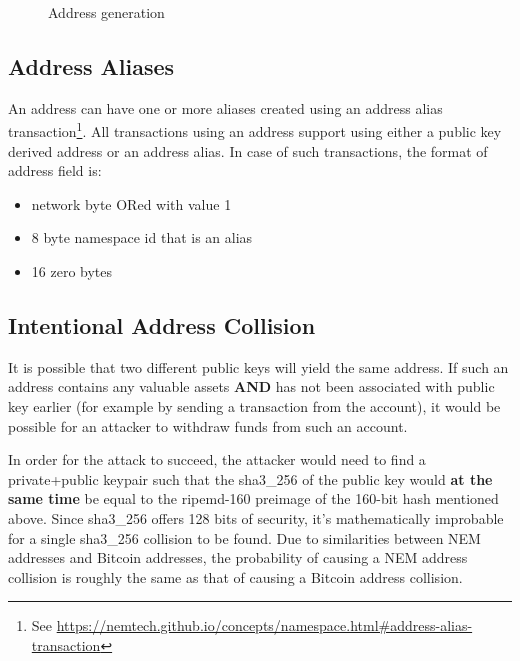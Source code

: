 \begin{figure}
	\begin{center}
		
		\caption{Address generation}
	\end{center}
\end{figure}

\pagebreak

\subsection{Address Aliases}
An address can have one or more aliases created using an address alias transaction\footnote{
See \url{https://nemtech.github.io/concepts/namespace.html\#address-alias-transaction}}.
All transactions using an address support using either a public key derived address or an address alias.
In case of such transactions, the format of address field is:
\begin{itemize}
	\item{network byte ORed with value 1}
	\item{8 byte namespace id that is an alias}
	\item{16 zero bytes}
\end{itemize}

\subsection{Intentional Address Collision}
It is possible that two different public keys will yield the same address.
If such an address contains any valuable assets \textbf{AND} has not been associated with public key earlier (for example by sending a transaction from the account), it would be possible for an attacker to withdraw funds from such an account.

In order for the attack to succeed, the attacker would need to find a private+public keypair such that the sha3\_256 of the public key would \textbf{at the same time} be equal to the ripemd-160 preimage of the 160-bit hash mentioned above.
Since sha3\_256 offers 128 bits of security, it's mathematically improbable for a single sha3\_256 collision to be found.
Due to similarities between NEM addresses and Bitcoin addresses, the probability of causing a NEM address collision is roughly the same as that of causing a Bitcoin address collision.
